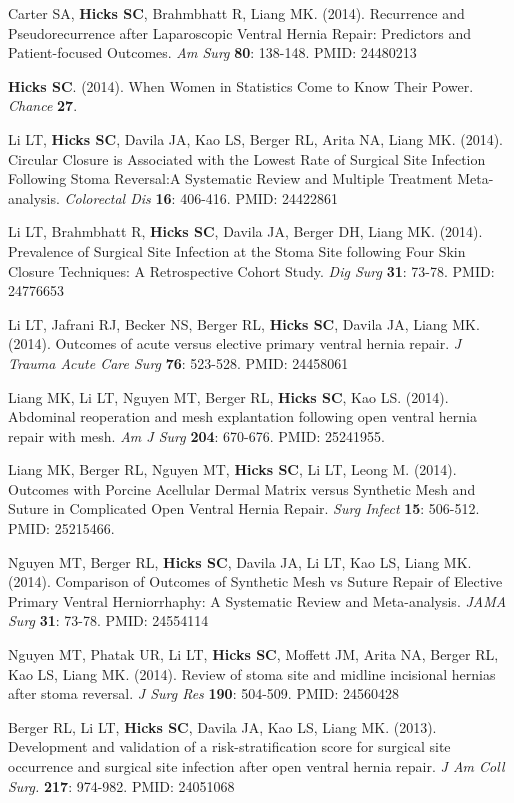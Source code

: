 \documentclass[10pt]{article}
\begin{document}
\begin{enumerate}[label= {[\arabic*]}]
\item Carter SA, {\bf Hicks SC}, Brahmbhatt R, Liang MK. (2014). Recurrence and Pseudorecurrence after Laparoscopic Ventral Hernia Repair: Predictors and Patient-focused Outcomes. {\it Am Surg} {\bf 80}: 138-148. PMID: 24480213
\item {\bf Hicks SC}. (2014). When Women in Statistics Come to Know Their Power. {\it Chance} {\bf 27}. 
\item Li LT, {\bf Hicks SC}, Davila JA, Kao LS, Berger RL, Arita NA, Liang MK. (2014). Circular Closure is Associated with the Lowest Rate of Surgical Site Infection Following Stoma Reversal:A Systematic Review and Multiple Treatment Meta-analysis. {\it Colorectal Dis} {\bf 16}: 406-416. PMID: 24422861
\item Li LT, Brahmbhatt R, {\bf Hicks SC}, Davila JA, Berger DH, Liang MK. (2014). Prevalence of Surgical Site Infection at the Stoma Site following Four Skin Closure Techniques: A Retrospective Cohort Study. {\it Dig Surg} {\bf 31}: 73-78. PMID: 24776653
\item Li LT, Jafrani RJ, Becker NS, Berger RL,  {\bf Hicks SC}, Davila JA, Liang MK. (2014). Outcomes of acute versus elective primary ventral hernia repair. {\it J Trauma Acute Care Surg} {\bf 76}: 523-528. PMID: 24458061
\item Liang MK, Li LT, Nguyen MT, Berger RL, {\bf Hicks SC}, Kao LS. (2014). Abdominal reoperation and mesh explantation following open ventral hernia repair with mesh. {\it Am J Surg} {\bf 204}: 670-676. PMID: 25241955. 
\item Liang MK, Berger RL, Nguyen MT, {\bf Hicks SC}, Li LT, Leong M. (2014). Outcomes with Porcine Acellular Dermal Matrix versus Synthetic Mesh and Suture in Complicated Open Ventral Hernia Repair. {\it Surg Infect} {\bf 15}: 506-512. PMID: 25215466. 
\item Nguyen MT, Berger RL, {\bf Hicks SC}, Davila JA, Li LT, Kao LS, Liang MK. (2014). Comparison of Outcomes of Synthetic Mesh vs Suture Repair of Elective Primary Ventral Herniorrhaphy: A Systematic Review and Meta-analysis. {\it JAMA Surg} {\bf 31}: 73-78. PMID: 24554114 
\item Nguyen MT, Phatak UR, Li LT, {\bf Hicks SC}, Moffett JM, Arita NA, Berger RL, Kao LS, Liang MK. (2014). Review of stoma site and midline incisional hernias after stoma reversal. {\it J Surg Res} {\bf 190}: 504-509. PMID: 24560428 
\item Berger RL, Li LT, {\bf Hicks SC}, Davila JA, Kao LS, Liang MK. (2013). Development and validation of a risk-stratification score for surgical site occurrence and surgical site infection after open ventral hernia repair. {\it J Am Coll Surg.} {\bf 217}: 974-982. PMID: 24051068

\end{enumerate}
\end{document}
